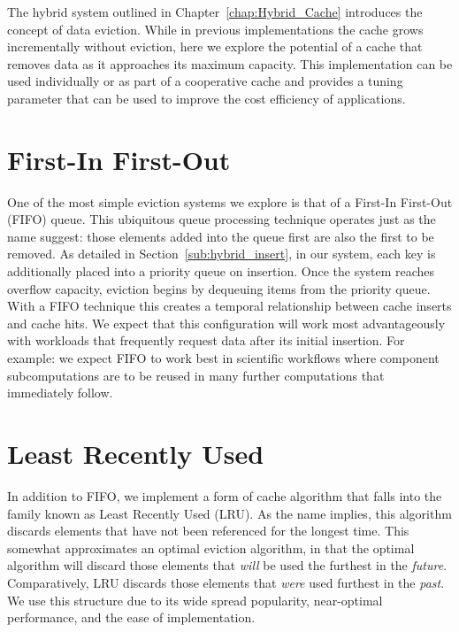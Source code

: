 The hybrid system outlined in Chapter~\ref{chap:Hybrid_Cache} introduces the
concept of data eviction. While in previous implementations the cache grows
incrementally without eviction, here we explore the potential of a cache that
removes data as it approaches its maximum capacity. This implementation can be
used individually or as part of a cooperative cache and provides a tuning
parameter that can be used to improve the cost efficiency of applications.

\section{First-In First-Out} %
\label{sec:fifo}
One of the most simple eviction systems we explore is that of a First-In
First-Out (FIFO) queue. This ubiquitous queue processing technique operates
just as the name suggest: those elements added into the queue first are also
the first to be removed. As detailed in Section~\ref{sub:hybrid_insert}, in our
system, each key is additionally placed into a priority queue on insertion. Once
the system reaches overflow capacity, eviction begins by dequeuing items from
the priority queue. With a FIFO technique this creates a temporal relationship
between cache inserts and cache hits. We expect that this configuration will
work most advantageously with workloads that frequently request data after its
initial insertion. For example: we expect FIFO to work best in scientific
workflows where component subcomputations are to be reused in many further
computations that immediately follow.


\section{Least Recently Used} %
\label{sec:lru}
In addition to FIFO, we implement a form of cache algorithm that falls into the
family known as Least Recently Used (LRU)\cite{lru}. As the name implies, this
algorithm discards elements that have not been referenced for the longest time.
This somewhat approximates an optimal eviction algorithm, in that the optimal
algorithm will discard those elements that \emph{will} be used the furthest in
the \emph{future}. Comparatively, LRU discards those elements that \emph{were}
used furthest in the \emph{past}. We use this structure due to its wide spread
popularity, near-optimal performance, and the ease of implementation.

